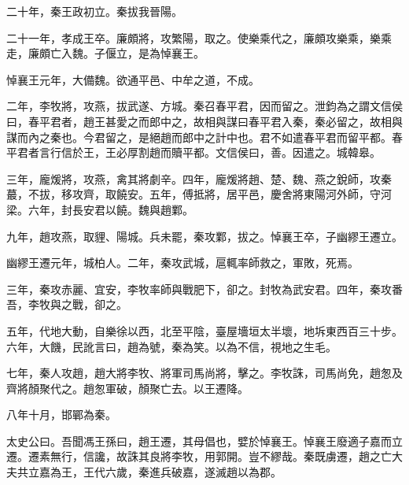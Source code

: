 二十年，秦王政初立。秦拔我晉陽。

二十一年，孝成王卒。廉頗將，攻繁陽，取之。使樂乘代之，廉頗攻樂乘，樂乘走，廉頗亡入魏。子偃立，是為悼襄王。

悼襄王元年，大備魏。欲通平邑、中牟之道，不成。

二年，李牧將，攻燕，拔武遂、方城。秦召春平君，因而留之。泄鈞為之謂文信侯曰，春平君者，趙王甚愛之而郎中之，故相與謀曰春平君入秦，秦必留之，故相與謀而內之秦也。今君留之，是絕趙而郎中之計中也。君不如遣春平君而留平都。春平君者言行信於王，王必厚割趙而贖平都。文信侯曰，善。因遣之。城韓皋。

三年，龐煖將，攻燕，禽其將劇辛。四年，龐煖將趙、楚、魏、燕之銳師，攻秦蕞，不拔，移攻齊，取饒安。五年，傅抵將，居平邑，慶舍將東陽河外師，守河梁。六年，封長安君以饒。魏與趙鄴。

九年，趙攻燕，取貍、陽城。兵未罷，秦攻鄴，拔之。悼襄王卒，子幽繆王遷立。

幽繆王遷元年，城柏人。二年，秦攻武城，扈輒率師救之，軍敗，死焉。

三年，秦攻赤麗、宜安，李牧率師與戰肥下，卻之。封牧為武安君。四年，秦攻番吾，李牧與之戰，卻之。

五年，代地大動，自樂徐以西，北至平陰，臺屋墻垣太半壞，地坼東西百三十步。六年，大饑，民訛言曰，趙為號，秦為笑。以為不信，視地之生毛。

七年，秦人攻趙，趙大將李牧、將軍司馬尚將，擊之。李牧誅，司馬尚免，趙怱及齊將顏聚代之。趙怱軍破，顏聚亡去。以王遷降。

八年十月，邯鄲為秦。

太史公曰。吾聞馮王孫曰，趙王遷，其母倡也，嬖於悼襄王。悼襄王廢適子嘉而立遷。遷素無行，信讒，故誅其良將李牧，用郭開。豈不繆哉。秦既虜遷，趙之亡大夫共立嘉為王，王代六歲，秦進兵破嘉，遂滅趙以為郡。